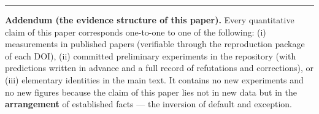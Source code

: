 \documentclass[
  a4paper,
]{article}
\begin{document}
\begin{center}\rule{0.5\linewidth}{0.5pt}\end{center}

\textbf{Addendum (the evidence structure of this paper).} Every
quantitative claim of this paper corresponds one-to-one to one of the
following: (i) measurements in published papers (verifiable through the
reproduction package of each DOI), (ii) committed preliminary
experiments in the repository (with predictions written in advance and a
full record of refutations and corrections), or (iii) elementary
identities in the main text. It contains no new experiments and no new
figures because the claim of this paper lies not in new data but in the
\textbf{arrangement} of established facts --- the inversion of default
and exception.
\end{document}
